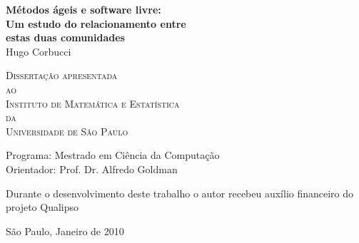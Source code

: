 \documentclass[11pt,twoside,a4paper]{book}
\begin{document}
\frontmatter 
\fancyhead[RO]{{\footnotesize\rightmark}\hspace{2em}\thepage}
\setcounter{tocdepth}{2}
\fancyhead[LE]{\thepage\hspace{2em}\footnotesize{\leftmark}}
\fancyhead[RE,LO]{}
\fancyhead[RO]{{\footnotesize\rightmark}\hspace{2em}\thepage}

\onehalfspacing  %


\thispagestyle{empty}
\begin{center}
  \vspace*{2.3cm}
  \textbf{\Large{Métodos ágeis e software livre:\\
      Um estudo do relacionamento entre\\
    estas duas comunidades}}\\
	
  \vspace*{1.2cm} \Large{Hugo Corbucci}
    
  \vskip 2cm \textsc{
    Dissertação apresentada\\[-0.25cm]
    ao\\[-0.25cm]
    Instituto de Matemática e Estatística\\[-0.25cm]
    da\\[-0.25cm]
    Universidade de São Paulo}
    
  \vskip 1.5cm
  Programa: Mestrado em Ciência da Computação\\
  Orientador: Prof. Dr. Alfredo Goldman

  \vskip 1cm \normalsize{Durante o desenvolvimento deste trabalho o
    autor recebeu auxílio financeiro do projeto Qualipso}
	
  \vskip 0.5cm \normalsize{São Paulo, Janeiro de 2010}
\end{center}
\end{document}
